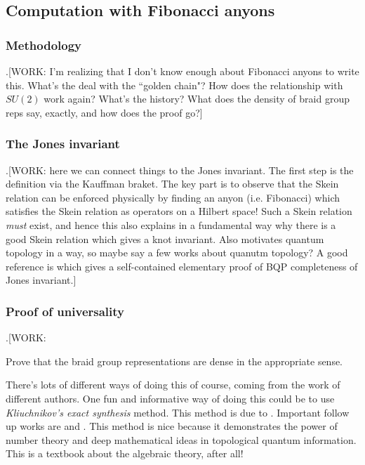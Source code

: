 \subsection{Computation with Fibonacci anyons}

\subsubsection{Methodology}

.[WORK: I'm realizing that I don't know enough about Fibonacci anyons to write this. What's the deal with the ``golden chain"? How does the relationship with $SU(2)$ work again? What's the history? What does the density of braid group reps say, exactly, and how does the proof go?]

\subsubsection{The Jones invariant}

.[WORK: here we can connect things to the Jones invariant. The first step is the definition via the Kauffman braket. The key part is to observe that the Skein relation can be enforced physically by finding an anyon (i.e. Fibonacci) which satisfies the Skein relation as operators on a Hilbert space! Such a Skein relation \textit{must} exist, and hence this also explains in a fundamental way why there is a good Skein relation which gives a knot invariant. Also motivates quantum topology in a way, so maybe say a few works about quanutm topology? A good reference is \cite{aharonov2011bqp} which gives a self-contained elementary proof of BQP completeness of Jones invariant.]

\subsubsection{Proof of universality}

.[WORK:

Prove that the braid group representations are dense in the appropriate sense.

There's lots of different ways of doing this of course, coming from the work of different authors. One fun and informative way of doing this could be to use \textit{Kliuchnikov's exact synthesis} method. This method is due to \cite{kliuchnikov2014asymptotically}. Important follow up works are \cite{kliuchnikov2015frameworkA} and \cite{kliuchnikov2015frameworkB}. This method is nice because it demonstrates the power of number theory and deep mathematical ideas in topological quantum information. This is a textbook about the algebraic theory, after all!

